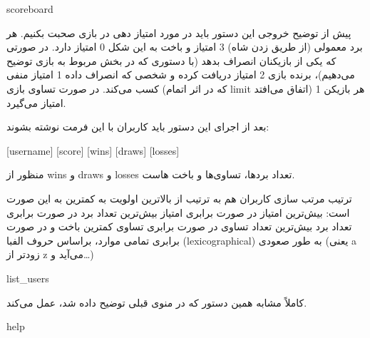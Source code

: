 \documentclass[]{article}
\begin{document}
\hrulefill


\begin{tcolorbox}[boxrule=0pt]
	\begin{latin}
  	  \large{
  	  	scoreboard
		}
	\end{latin}
\end{tcolorbox}



پیش از توضیح خروجی این دستور باید در مورد امتیاز دهی در بازی صحبت بکنیم. هر برد معمولی (از طریق زدن شاه) 3 امتیاز و باخت به این شکل 0 امتیاز دارد. در صورتی که یکی از بازیکنان انصراف بدهد (با دستوری که در بخش مربوط به بازی توضیح می‌دهیم)، برنده بازی 2 امتیاز دریافت کرده و شخصی که انصراف داده 1 امتیاز منفی کسب می‌کند. در صورت تساوی بازی (که در اثر اتمام limit اتفاق می‌افتد) هر بازیکن 1 امتیاز می‌گیرد.

 بعد از اجرای این دستور باید کاربران با این فرمت نوشته بشوند:

\begin{tcolorbox}[boxrule=0pt]
	\begin{latin}
  	  \large{
  	  	[username] [score] [wins] [draws] [losses]
		}
	\end{latin}
\end{tcolorbox}



منظور از wins و draws و losses تعداد بردها، تساوی‌ها و باخت هاست.

ترتیب مرتب سازی کاربران هم به ترتیب از بالاترین اولویت به کمترین به این صورت است: بیش‌ترین امتیاز \- در صورت برابری امتیاز بیش‌ترین تعداد برد \- در صورت برابری تعداد برد بیش‌ترین تعداد تساوی \- در صورت برابری تساوی کمترین باخت و در صورت برابری تمامی موارد، براساس حروف الفبا (lexicographical) به طور صعودی (یعنی a زودتر از z می‌آید و…)


\hrulefill





\begin{tcolorbox}[boxrule=0pt]
	\begin{latin}
  	  \large{
  	  	list\_users
		}
	\end{latin}
\end{tcolorbox}

کاملاً مشابه همین دستور که در منوی قبلی توضیح داده شد، عمل می‌کند.

\hrulefill


\begin{tcolorbox}[boxrule=0pt]
	\begin{latin}
  	  \large{
  	  	help
		}
	\end{latin}
\end{tcolorbox}
\end{document}
